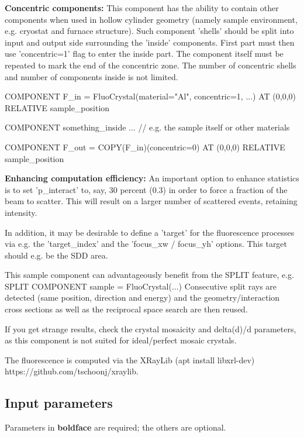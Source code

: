 \textbf{Concentric components:} This component has the ability to contain other components when used in hollow cylinder geometry (namely sample environment, e.g. cryostat and furnace structure). Such component 'shells' should be split into input and output side surrounding the 'inside' components. First part must then use 'concentric=1' flag to enter the inside part. The component itself must be repeated to mark the end of the concentric zone. The number of concentric shells and number of components inside is not limited.

COMPONENT F\_in = FluoCrystal(material="Al", concentric=1, ...) AT (0,0,0) RELATIVE sample\_position

COMPONENT something\_inside ... // e.g. the sample itself or other materials

COMPONENT F\_out = COPY(F\_in)(concentric=0) AT (0,0,0) RELATIVE sample\_position

\textbf{Enhancing computation efficiency:} An important option to enhance statistics is to set 'p\_interact' to, say, 30 percent (0.3) in order to force a fraction of the beam to scatter. This will result on a larger number of scattered events, retaining intensity.

In addition, it may be desirable to define a 'target' for the fluorescence processes via e.g. the 'target\_index' and the 'focus\_xw / focus\_yh' options. This target should e.g. be the SDD area.

This sample component can advantageously benefit from the SPLIT feature, e.g. SPLIT COMPONENT sample = FluoCrystal(...) Consecutive split rays are detected (same position, direction and energy) and the geometry/interaction cross sections as well as the reciprocal space search are then reused.

If you get strange results, check the crystal mosaicity and delta(d)/d parameters, as this component is not suited for ideal/perfect mosaic crystals.

The fluorescence is computed via the XRayLib (apt install libxrl-dev) https://github.com/tschoonj/xraylib.

\subsection*{Input parameters}
Parameters in \textbf{boldface} are required; the others are optional.

